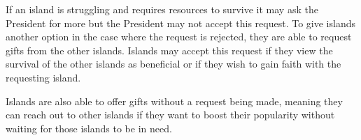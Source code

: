 
If an island is struggling and requires resources to survive it may ask the President for more but the President may not accept this request. To give islands another option in the case where the request is rejected, they are able to request gifts from the other islands. Islands may accept this request if they view the survival of the other islands as beneficial or if they wish to gain faith with the requesting island.

Islands are also able to offer gifts without a request being made, meaning they can reach out to other islands if they want to boost their popularity without waiting for those islands to be in need.